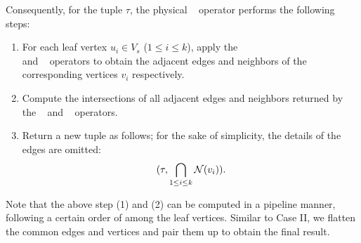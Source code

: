Consequently, for the tuple $\tau$, the physical \expandintersect~ operator performs the following steps:



\begin{enumerate}
\item For each leaf vertex $u_i \in V_s$ ($1 \leq i \leq k$), apply the \expandedge~ \\ and \getvertex~ operators to obtain the adjacent edges and neighbors of the corresponding vertices $v_i$ respectively.
\item Compute the intersections of all adjacent edges and neighbors returned by the \expandedge~ and \getvertex~ operators.
\item Return a new tuple as follows; for the sake of simplicity, the details of the edges are omitted:
\[
    (\tau, \bigcap_{1 \leq i \leq k}{\mathcal{N}}(v_i)).
\]

\end{enumerate}

Note that the above step (1) and (2) can be computed in a pipeline manner, following a certain order of among the leaf vertices.
Similar to Case II, we flatten the common edges and vertices and pair them up to obtain the final result.

